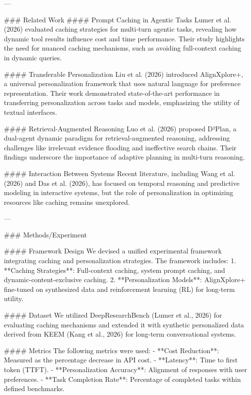---

### Related Work  
#### Prompt Caching in Agentic Tasks  
Lumer et al. (2026) evaluated caching strategies for multi-turn agentic tasks, revealing how dynamic tool results influence cost and time performance. Their study highlights the need for nuanced caching mechanisms, such as avoiding full-context caching in dynamic queries.

#### Transferable Personalization  
Liu et al. (2026) introduced AlignXplore+, a universal personalization framework that uses natural language for preference representation. Their work demonstrated state-of-the-art performance in transferring personalization across tasks and models, emphasizing the utility of textual interfaces.

#### Retrieval-Augmented Reasoning  
Luo et al. (2026) proposed D²Plan, a dual-agent dynamic paradigm for retrieval-augmented reasoning, addressing challenges like irrelevant evidence flooding and ineffective search chains. Their findings underscore the importance of adaptive planning in multi-turn reasoning.

#### Interaction Between Systems  
Recent literature, including Wang et al. (2026) and Das et al. (2026), has focused on temporal reasoning and predictive modeling in interactive systems, but the role of personalization in optimizing resources like caching remains unexplored.

---

### Methods/Experiment  

#### Framework Design  
We devised a unified experimental framework integrating caching and personalization strategies. The framework includes:  
1. **Caching Strategies**: Full-context caching, system prompt caching, and dynamic-content-exclusive caching.  
2. **Personalization Models**: AlignXplore+ fine-tuned on synthesized data and reinforcement learning (RL) for long-term utility.  

#### Dataset  
We utilized DeepResearchBench (Lumer et al., 2026) for evaluating caching mechanisms and extended it with synthetic personalized data derived from KEEM (Kang et al., 2026) for long-term conversational systems.

#### Metrics  
The following metrics were used:  
- **Cost Reduction**: Measured as the percentage decrease in API cost.  
- **Latency**: Time to first token (TTFT).  
- **Personalization Accuracy**: Alignment of responses with user preferences.  
- **Task Completion Rate**: Percentage of completed tasks within defined benchmarks.

